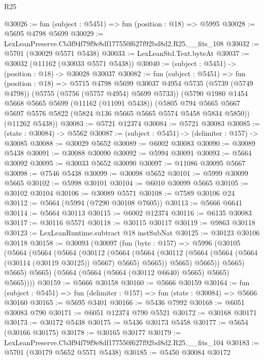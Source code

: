 \begin{lexlean}{R25}
\begin{coremodule}
@30026 := fun (subject : @5451) => fun (position : @18) => @5995
@30028 := @5695 @4798 @5699
@30029 := LexLeanPreserve.Cb3f94f79f9e8df177550f627f92bd8d2.R25.__fits_108
@30032 := @5701 (@30029 @5571 @5438)
@30033 := LexLeanStd.Text.byteAt
@30037 := @30032 (@11162 (@30033 @5571 @5438))
@30040 := (subject : @5451) -> (position : @18) -> @30028 @30037
@30082 := fun (subject : @5451) =>
  fun (position : @18) =>
  @5715
    @4798
    @5699
    @30037
    @4954
    @5735
    (@5739 (@5749 @4798))
    (@5755 (@5756 (@5757 @4954) @5699 @5733))
    (@5790
      @1980
      @1454
      @5668
      @5665
      @5699
      (@11162 (@11091 @5438))
      (@5805 @794 @5665 @5667 @5697 @5576 @5822 (@5824 @136 @5665 @5665 @5574 @5458 @5834 @5850))
      (@11262 @5438))
@30083 := @5721 @12374
@30084 := @5721 @30083
@30085 := (state : @30084) -> @5562
@30087 := (subject : @5451) -> (delimiter : @157) -> @30085
@30088 := @30029 @5652
@30089 := @6002 @30083
@30090 := @30089 @5438
@30091 := @30088 @30090
@30092 := @5994 @30091
@30093 := @5664 @30092
@30095 := @30033 @5652 @30090
@30097 := @11086 @30095 @5667
@30098 := @7546 @5438
@30099 := @30098 @5652
@30101 := @5999 @30099 @5665
@30102 := @5998 @30101
@30104 := @6010 @30099 @5665
@30105 := @30102 @30104
@30106 := @30089 @5571
@30108 := @7589 @30106 @24
@30112 := @5664 (@5994 (@7290 @30108 @7605))
@30113 := @5666 @6641
@30114 := @5664 @30113
@30115 := @6002 @12374
@30116 := @6135 @30083
@30117 := @30116 @5571
@30118 := @30115 @30117
@30119 := @9863 @30118
@30123 := LexLeanRuntime.subtract @18 instSubNat
@30125 := @30123 @30106 @30118
@30158 := @30093
    (@30097
      (fun (byte : @157) =>
      @5996
        (@30105
          (@5664
            (@5664
              (@5664
                (@30112
                  (@5664
                    (@5664
                      (@30112 (@5664 (@5664 (@5664 (@30114 (@30119 @30125)) @5667) @5665) @5665))
                      @5665)
                    @5665))
                @5665)
              @5665)
            @5665)
          (@5664 (@5664 (@5664 (@30112 @6640) @5665) @5665) @5665))))
@30159 := @5666 @30158
@30160 := @5666 @30159
@30164 := fun (subject : @5451) => fun (delimiter : @157) => fun (state : @30084) => @5666 @30160
@30165 := @5695 @3401
@30166 := @5436 @7992
@30168 := @6051 @30083 @790
@30171 := @6051 @12374 @790 @5521
@30172 := @30168 @30171
@30173 := @30172 @5438
@30175 := @5436 @30173 @5458
@30177 := @5654 (@30166 @30175)
@30178 := @30165 @30177
@30179 := LexLeanPreserve.Cb3f94f79f9e8df177550f627f92bd8d2.R25.__fits_104
@30183 := @5701 (@30179 @5652 @5571 @5438)
@30185 := @5450 @30084 @30172

\end{coremodule}
\end{lexlean}
